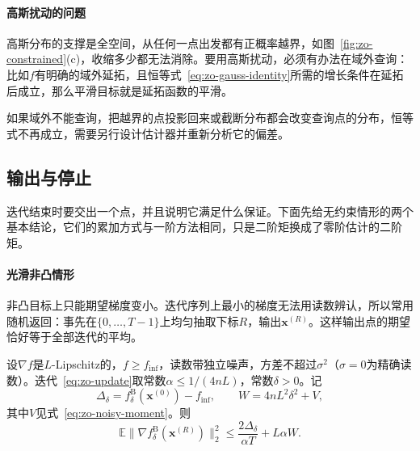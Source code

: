 \paragraph{高斯扰动的问题}
高斯分布的支撑是全空间，从任何一点出发都有正概率越界，如图~\ref{fig:zo-constrained}(c)，收缩多少都无法消除。要用高斯扰动，必须有办法在域外查询：比如$f$有明确的域外延拓，且恒等式~\eqref{eq:zo-gauss-identity}所需的增长条件在延拓后成立，那么平滑目标就是延拓函数的平滑。

如果域外不能查询，把越界的点投影回来或截断分布都会改变查询点的分布，恒等式不再成立，需要另行设计估计器并重新分析它的偏差。

\subsection{输出与停止}
\label{sec:zo-output}

迭代结束时要交出一个点，并且说明它满足什么保证。下面先给无约束情形的两个基本结论，它们的累加方式与一阶方法相同，只是二阶矩换成了零阶估计的二阶矩。

\paragraph{光滑非凸情形}
非凸目标上只能期望梯度变小。迭代序列上最小的梯度无法用读数辨认，所以常用随机返回：事先在$\{0,\ldots,T-1\}$上均匀抽取下标$R$，输出$\bm{x}^{(R)}$。这样输出点的期望恰好等于全部迭代的平均。

\begin{theorem}[光滑非凸目标]
\label{thm:zo-nonconvex}
设$\nabla f$是$L$-Lipschitz的，$f\geq f_{\inf}$，读数带独立噪声，方差不超过$\sigma^2$（$\sigma=0$为精确读数）。迭代~\eqref{eq:zo-update}取常数$\alpha\leq1/(4nL)$，常数$\delta>0$。记
\begin{equation}
 \Delta_\delta=f^{\mathrm{B}}_{\delta}(\bm{x}^{(0)})-f_{\inf},\qquad W=4nL^2\delta^2+V,
 \label{eq:zo-nonconvex-constants}
\end{equation}
其中$V$见式~\eqref{eq:zo-noisy-moment}。则
\begin{equation}
 \mathbb{E}\bigl\lVert\nabla f^{\mathrm{B}}_{\delta}(\bm{x}^{(R)})\bigr\rVert_2^2\leq\frac{2\Delta_\delta}{\alpha T}+L\alpha W.
 \label{eq:zo-nonconvex-rate}
\end{equation}
\end{theorem}

